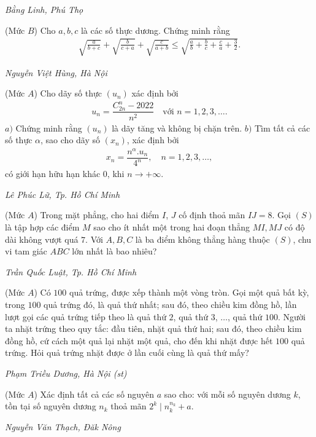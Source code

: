 \begin{multicols}{2}
\begin{figure}[H]
	\end{figure}
	\begin{flushright}
		\textit{Bằng Linh, Phú Thọ}
	\end{flushright}
	{}
	(Mức $B$) Cho $a, b, c$ là các số thực dương. Chứng minh rằng
	\begin{align*}
		\sqrt{\!\!\frac{a}{b\!+\!c}}\!+\!\sqrt{\!\!\frac{b}{c\!+\!a}}\!+\!\sqrt{\!\!\frac{c}{a\!+\!b}}
		\!\leq\! \sqrt{\!\!\frac{a}{b}\!+\!\frac{b}{c}\!+\!\frac{c}{a}\!+\!\frac{3}{2}} .
	\end{align*}
	\begin{flushright}
		\textit{Nguyễn Việt Hùng, Hà Nội}
	\end{flushright}
	{}
	(Mức $A$) Cho dãy số thực $(u_n)$ xác định bởi 
	\begin{align*}
		u_n=\dfrac{C^n_{2n}-2022}{n^2}\quad\text{với $n=1,2,3,\ldots$}.
	\end{align*}
	$a)$ Chứng minh rằng $(u_n)$ là dãy tăng và không bị chặn trên.
	\vskip 0.05cm
	$b)$ Tìm tất cả các số thực $\alpha$,  sao cho dãy số $(x_n)$, xác định bởi
	\begin{align*}
		x_n=\dfrac{n^\alpha. u_n}{4^n},\quad n=1,2,3,\ldots,
	\end{align*}
	có giới hạn hữu hạn khác $0$, khi $n\to+\infty$.
	\begin{flushright}
		\textit{Lê Phúc Lữ, Tp. Hồ Chí Minh}
	\end{flushright}
	{}
	(Mức $A$) Trong mặt phẳng, cho hai điểm $I$, $J$ cố định thoả mãn $IJ=8$.  Gọi $(S)$ là tập hợp các điểm $M$ sao cho ít nhất một trong hai đoạn thẳng $MI,MJ$ có độ dài không vượt quá $7$. Với $A,B,C$ là ba điểm không thẳng hàng thuộc $(S)$, chu vi tam giác $ABC$ lớn nhất là bao nhiêu?
	\begin{flushright}
		\textit{Trần Quốc Luật, Tp. Hồ Chí Minh}
	\end{flushright}
	{}
	(Mức $A$) Có $100$ quả trứng, được xếp thành một vòng tròn. Gọi một quả bất kỳ, trong $100$ quả trứng đó, là quả thứ nhất; sau đó, theo chiều kim đồng hồ, lần lượt gọi các quả trứng tiếp theo là quả thứ $2$, quả thứ $3$, $\ldots$, quả thứ $100$. Người ta nhặt trứng theo quy tắc: đầu tiên, nhặt quả thứ hai; sau đó, theo chiều kim đồng hồ, cứ cách một quả lại nhặt một quả, cho đến khi nhặt được hết $100$ quả trứng. Hỏi quả trứng nhặt được ở lần cuối cùng là quả thứ mấy?
	\begin{flushright}
		\textit{Phạm Triều Dương, Hà Nội (st)}
	\end{flushright}
	{}
	(Mức $A$) Xác định tất cả các số nguyên $a$ sao cho: với mỗi số nguyên dương $k$, tồn tại số nguyên dương $n_k$ thoả mãn $2^k\mid n_k^{n_k}+a$. 
	\begin{flushright}
		\textit{Nguyễn Văn Thạch, Đăk Nông}
	\end{flushright}
\end{multicols}
